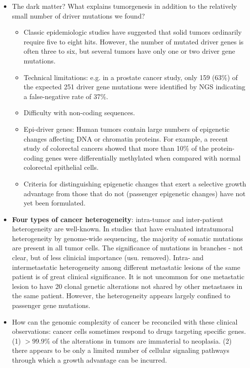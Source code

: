 \documentclass{report}
\begin{document}
\begin{itemize}
	\item The dark matter? What explains tumorgenesis in addition to the relatively small number of driver mutations we found? 
	\begin{itemize}
		\item Classic epidemiologic studies have suggested that solid tumors ordinarily require five to eight hits. However, the number of mutated driver genes is often three to six, but several tumors have only one or two driver gene mutations. 
		\item Technical limitations: e.g. in a prostate cancer study, only 159 (63\%) of the expected 251 driver gene mutations were identified by NGS indicating a false-negative rate of 37\%.
		\item Difficulty with non-coding sequences. 
		\item Epi-driver genes: Human tumors contain large numbers of epigenetic changes affecting DNA or chromatin proteins. For example, a recent study of colorectal cancers showed that more than 10\% of the protein-coding genes were differentially methylated when compared with normal colorectal epithelial cells. 
		\item Criteria for distinguishing epigenetic changes that exert a selective growth advantage from those that do not (passenger epigenetic changes) have not yet been formulated. 
	\end{itemize}
	
	\item \textbf{Four types of cancer heterogeneity}: intra-tumor and inter-patient heterogeneity are well-known. In studies that have evaluated intratumoral heterogeneity by genome-wide sequencing, the majority of somatic mutations are present in all tumor cells. The significance of mutations in branches - not clear, but of less clinicial importance (usu. removed). Intra- and intermetastatic heterogeneity among different metastatic lesions of the same patient is of great clinical significance. It is not uncommon for one metastatic lesion to have 20 clonal genetic alterations not shared by other metastases in the same patient. However, the heterogeneity appears largely confined to passenger gene mutations. 
	
	\item How can the genomic complexity of cancer be reconciled with these clinical observations: cancer cells sometimes respond to drugs targeting specific genes. (1) $>99.9\%$ of the alterations in tumors are immaterial to neoplasia. (2) there appears to be only a limited number of cellular signaling pathways through which a growth advantage can be incurred. 
	

\end{itemize}
\end{document}

